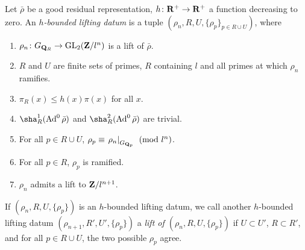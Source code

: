 \begin{definition}
Let $\bar\rho$ be a good residual representation, $h\colon \mathbf{R}^+ \to \mathbf{R}^+$ a 
function decreasing to zero. An \emph{$h$-bounded lifting datum} is a tuple 
$(\rho_n,R,U,\{\rho_p\}_{p\in R\cup U})$, where 
\begin{enumerate}
\item
$\rho_n\colon G_{\mathbf{Q}_R} \to \operatorname{GL}_2(\mathbf{Z}/l^n)$ is a lift of $\bar\rho$.

\item
$R$ and $U$ are finite sets of primes, $R$ containing $l$ and all primes at 
which $\rho_n$ ramifies. 

\item
$\pi_R(x)\leqslant h(x)\pi(x)$ for all $x$. 

\item
$\sha_R^1(\Ad^0\bar\rho)$ and $\sha_R^2(\Ad^0\bar\rho)$ are trivial. 

\item
For all $p\in R\cup U$, 
$\rho_p\equiv \left. \rho_n\right|_{G_{\mathbf{Q}_p}}\pmod{l^n}$. 

\item
For all $p\in R$, $\rho_p$ is ramified. 

\item
$\rho_n$ admits a lift to $\mathbf{Z}/l^{n+1}$. 
\end{enumerate}
\end{definition}

If $(\rho_n,R,U,\{\rho_p\})$ is an $h$-bounded lifting datum, we call 
another $h$-bounded lifting datum $(\rho_{n+1},R',U',\{\rho_p\})$ a \emph{lift 
of $(\rho_n,R,U,\{\rho_p\})$} if $U\subset U'$, $R\subset R'$, and for all 
$p\in R\cup U$, the two possible $\rho_p$ agree. 

